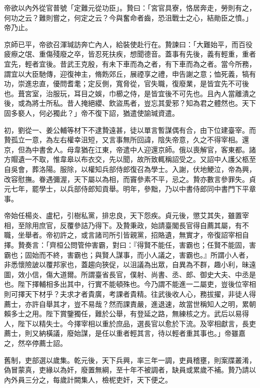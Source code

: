 \begin{pinyinscope}
 帝欲以內外從官普號「定難元從功臣」。贄曰：「宮官具寮，恪居奔走，勞則有之，何功之云？難則嘗之，何定之云？今與奮命者齒，恐沮戰士之心，結勛臣之憤。」帝乃止。



 京師已平，帝欲召渾瑊訪奔亡內人，給裝使赴行在。贄諫曰：「大難始平，而百役疲瘵之氓、重傷殘廢之卒，皆忍死扶疾，想聞德音。蓋事有先後，義有輕重，重者宜先，輕者宜後。昔武王克殷，有未下車而為之者，有下車而為之者。當今所務，謂宜以大臣馳傳，迎復神主，脩飭郊丘，展禋享之禮，申告謝之意；恤死義，犒有功，崇進忠直，優問耆耄；定反側，寬脅從，官失職，復廢業，是皆宜先不可後也。葺宮室，治服玩，耳目之娛，巾櫛之侍，是皆宜後不可先也。且內人當離潰之後，或為將士所私。昔人掩絕纓、飲盜馬者，豈忘其愛邪？知為君之體然也。天下固多褻人，何必獨此？」帝不復下詔，猶遣使諭瑊資遣。



 初，劉從一、姜公輔等材下不逮贄遠甚，徒以單言暫謀偶有合，由下位建臺宰。而贄孤立一意，為左右權幸沮短，又言事無所回諱，陰失帝意，久之不得宰相。還京，但為中書舍人。母韋猶在江東，帝遣中人迎還京師。俄以喪解官，客東都。諸方賵遺一不取，惟韋皋以布衣交，先以聞，故所致輒稱詔受之。又詔中人護父柩至自吳會，葬洛陽。服除，以權知兵部侍郎復召為學士。入謝，伏地鯁泣，帝為興，改容慰撫。眷遇彌渥，天下屬以為相，而竇參素不平，忌之。贄亦數言參罪失。貞元七年，罷學士，以兵部侍郎知貢舉。明年，參黜，乃以中書侍郎同中書門下平章事。



 帝始任楊炎、盧杞，引樹私黨，排忠良，天下怨疾。貞元後，懲艾其失，雖置宰相，至除用庶官，反覆參詰乃得下。及贄秉政，始請臺閣長官得自薦其屬，有不職，坐舉者。帝初許之，或言諸司所引皆親黨，招賂遺，無實才，帝復詔宰相自擇。贄奏言：「齊桓公問管仲害霸，對曰：『得賢不能任，害霸也；任賢不能固，害霸也；固始而不終，害霸也；與賢人謀事，而小人議之，害霸也。』所謂小人者，非悉懷險詖以覆邦家也，蓋趨向狹促，以沮議為出眾，自異為不群，趣小利，昧遠圖，效小信，傷大道爾。所謂臺省長官，僕射、尚書、丞、郎、御史大夫、中丞是也。陛下擇輔相多出其中，行實不能頓殊也。今乃謂不能進一二屬吏，豈後位宰相則可擇天下材乎？夫求才者貴廣，考課者貴精。往武後收人心，務拔擢，非徒人得薦士，亦許自舉其才，豈不易哉？然而課責嚴，進退速，故當世稱知人之明，累朝賴多士之用。陛下賞鑒獨任，難於公舉，有登延之路，無練核之方。武后以易得人，陛下以精失士。今擇宰相以重於庶品，選長官以愈於下流。及宰相獻言，長吏薦士，則又納橫議，廢始謀，是任以重者輕其言，待以輕者重其事也。」帝雖嘉之，然卒停薦士詔。



 舊制，吏部選以歲集。乾元後，天下兵興，率三年一調，吏員稽壅，則案牒叢淆，偽冒蒙真，吏緣以為奸，廢置無綱，至十年不被調者，缺員或累歲不補。贄乃請以內外員三分之，每歲計闕集人，檢柅吏奸，天下便之。




\end{pinyinscope}
